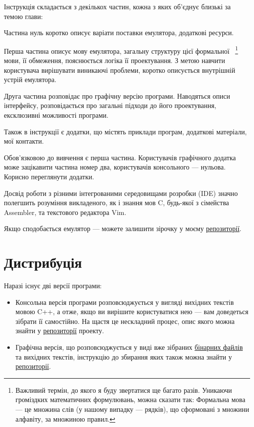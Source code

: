\documentclass[oneside,final,14pt]{extreport}
\begin{document}
\bigskip

Інструкція складається з декількох частин, кожна з яких об'єднує близькі за темою глави:

Частина нуль коротко описує варіати поставки емулятора, додаткові ресурси.

Перша частина описує мову емулятора, загальну структуру цієї 
формальної~
\footnote{Важливий термін, до якого я буду звертатися ще багато разів. Уникаючи громіздких математичних формулювань, можна сказати так: Формальна мова --- це множина слів (у нашому випадку --- рядків), що сформовані з множини алфавіту, за множиною правил.}
мови, її обмеження, пояснюється логіка її проектування. З метою навчити користувача вирішувати виникаючі проблеми, коротко описується внутрішній устрій емулятора.

Друга частина розповідає про графічну версію програми. Наводяться описи інтерфейсу, розповідається про загальні підходи до його проектування, ексклюзивні можливості програми. 


Також в інструкції є додатки, що містять приклади програм, додаткові матеріали, мої контакти.

\bigskip

\bigskip 

Обов'язковою до вивчення є перша частина. Користувачів графічного додатка може зацікавити частина номер два, користувачів консольного --- нульова. Корисно переглянути додатки.

Досвід роботи з різними інтегрованими середовищами розробки (IDE) значно полегшить розуміння викладеного, як і знання мов C, будь-якої з сімейства Assembler, та текстового редактора Vim.

\bigskip

\bigskip

Якщо сподобається емулятор --- можете залишити зірочку у моєму  \href{https://github.com/Kaifolog/TME}{репозиторії}.

\setcounter{chapter}{-1}

\chapter{Дистрибуція}

 
\vspace{0.4 cm}
 
Наразі існує дві версії програми: 
\begin{itemize}
	\item Консольна версія програми розповсюджується у вигляді вихідних текстів мовою C++, а отже, якщо ви вирішите користуватися нею --- вам доведеться зібрати її самостійно. На щастя це нескладний процес, опис якого можна знайти у \href{https://github.com/Kaifolog/TME}{репозиторії} проекту.
	\item Графічна версія, що розповсюджується у виді вже зібраних \href{https://kaifolog.github.io/TME-website/}{бінарних файлів} та вихідних текстів, інструкцію до збирання яких також можна знайти у \href{https://github.com/Kaifolog/TME}{репозиторії}. 
\end{itemize}
\end{document}
